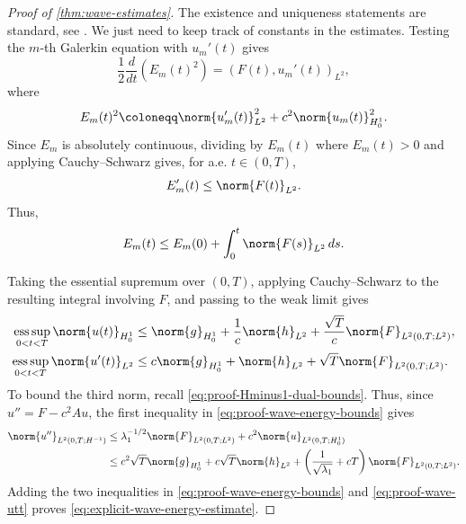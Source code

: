 \begin{proof}[Proof of \cref{thm:wave-estimates}]
The existence and uniqueness statements are standard, see
\cite[Section 7.2.2]{evans_2010}. We just need to keep track of constants in the estimates. Testing the $m$-th Galerkin equation with
\(u_m'(t)\) gives
\[
    \frac12\frac{d}{dt}
    \left(
        E_m(t)^2
    \right)
    =
    (F(t),u_m'(t))_{L^2},
\]
where
\[
    E_m(t)^2
    \coloneqq
    \norm{u_m'(t)}_{L^2}^2
    +
    c^2\norm{u_m(t)}_{H_0^1}^2 .
\]
Since \(E_m\) is absolutely continuous, dividing by \(E_m(t)\) where
\(E_m(t)>0\) and applying Cauchy--Schwarz gives, for a.e. \(t\in(0,T)\),
\[
    E_m'(t)
    \le
    \norm{F(t)}_{L^2}.
\]
Thus,
\[
    E_m(t)\le E_m(0)+\int_0^t\norm{F(s)}_{L^2}\,ds .
\]

Taking the essential supremum over \((0,T)\), applying Cauchy--Schwarz to the
resulting integral involving $F$, and passing to the weak limit gives
\begin{equation}\label{eq:proof-wave-energy-bounds}
\begin{split}
    \operatorname*{ess\,sup}_{0<t<T}\norm{u(t)}_{H_0^1}
    &\le
    \norm{g}_{H_0^1}
    +
    \frac1c\norm{h}_{L^2}
    +
    \frac{\sqrt{T}}{c}
    \norm{F}_{L^2(0,T;L^2)},
    \\
    \operatorname*{ess\,sup}_{0<t<T}\norm{u'(t)}_{L^2}
    &\le
    c\norm{g}_{H_0^1}
    +
    \norm{h}_{L^2}
    +
    \sqrt{T}
    \norm{F}_{L^2(0,T;L^2)}.
\end{split}
\end{equation}
To bound the third norm, recall \eqref{eq:proof-Hminus1-dual-bounds}.
Thus, since \(u''=F-c^2Au\), the first inequality in
\eqref{eq:proof-wave-energy-bounds} gives
\begin{equation}\label{eq:proof-wave-utt}
\begin{split}
    \norm{u''}_{L^2(0,T;H^{-1})}
    &\le
    \lambda_1^{-1/2}
    \norm{F}_{L^2(0,T;L^2)}
    +
    c^2
    \norm{u}_{L^2(0,T;H_0^1)}
    \\
    &\le
    c^2\sqrt{T}\norm{g}_{H_0^1}
    +
    c\sqrt{T}\norm{h}_{L^2}
    +
    \left(
        \frac1{\sqrt{\lambda_1}}
        +
        cT
    \right)
    \norm{F}_{L^2(0,T;L^2)}.
\end{split}
\end{equation}
Adding the two inequalities in \eqref{eq:proof-wave-energy-bounds} and
\eqref{eq:proof-wave-utt} proves \eqref{eq:explicit-wave-energy-estimate}.
\end{proof}



